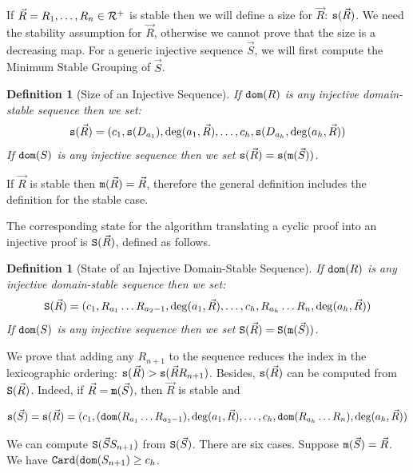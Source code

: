 \documentclass{lmcs}
\newtheorem{definition}[theorem]{Definition}
\begin{document}
If $\vec{R} = R_1, \ldots, R_n \in {\mathcal R}^+$ is stable then we will define a size for $\vec{R}$: 
${\tt s}(\vec{R})$. We need the stability assumption for $\vec{R}$, 
otherwise we cannot prove that 
the size is a decreasing map. For a generic injective sequence $\vec{S}$, we will first compute
the Minimum Stable Grouping of $\vec{S}$.

\begin{definition}[Size of an Injective Sequence]
If ${\tt dom}(R)$ is any injective domain-stable sequence then we set:
$$
{\tt s}(\vec{R}) 
= 
(c_1, {\tt s}(D_{a_1}), \deg(a_1,\vec{R}), \ldots,c_h,{\tt s}(D_{a_h},\deg(a_h,\vec{R}))
$$
If ${\tt dom}(S)$ is any injective sequence then we set ${\tt s}(\vec{R}) = {\tt s}({\tt m}(\vec{S}))$.
\end{definition}

If $\vec{R}$ is stable then ${\tt m}(\vec{R}) = \vec{R}$, therefore 
the general definition includes the definition for the stable case.

The corresponding state for the algorithm translating a cyclic proof into an
injective proof is ${\tt S}(\vec{R})$, defined as follows.

\begin{definition}[State of an Injective Domain-Stable Sequence]
If ${\tt dom}(R)$ is any injective domain-stable sequence then we set:
$$
{\tt S}(\vec{R})
=
(c_1, R_{a_1}\ldots R_{a_2-1}, \deg(a_1,\vec{R}), 
\ldots,
c_h, R_{a_h}\ldots R_{n}, \deg(a_h,\vec{R}))
$$
If ${\tt dom}(S)$ is any injective sequence then we set ${\tt S}(\vec{R}) = {\tt S}({\tt m}(\vec{S}))$.
\end{definition}
 
We prove that adding any $R_{n+1}$ to the sequence reduces the index in the 
lexicographic ordering: ${\tt s}(\vec{R}) > {\tt s}(\vec{R}R_{n+1}) $. Besides,
${\tt s}(\vec{R})$ can be computed from ${\tt S}(\vec{R})$. Indeed, if
$\vec{R} = {\tt m}(\vec{S})$, then $\vec{R}$ is stable and

$$
{\tt s}(\vec{S})
=
{\tt s}(\vec{R})
=
(
 c_1,({\tt dom}(R_{a_1}\ldots R_{a_2-1}), \deg(a_1,\vec{R}), 
 \ldots,
 c_h,{\tt dom}(R_{a_h}\ldots R_{n}), \deg(a_h,\vec{R})
 )
$$

We can compute ${\tt S}(\vec{S}S_{n+1})$ from ${\tt S}(\vec{S})$.
There are six cases. Suppose ${\tt m}(\vec{S}) = \vec{R}$.
We have ${\tt Card}({\tt dom}(S_{n+1}) \ge c_h$.
\end{document}

